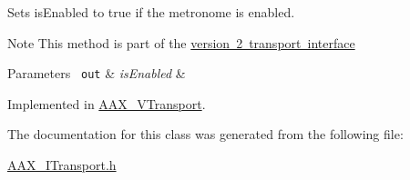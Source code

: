 Sets is\+Enabled to true if the metronome is enabled. 

\begin{DoxyNote}{Note}
This method is part of the \mbox{\hyperlink{a01761}{version 2 transport interface}}
\end{DoxyNote}

\begin{DoxyParams}[1]{Parameters}
\mbox{\texttt{ out}}  & {\em is\+Enabled} & \\
\hline
\end{DoxyParams}


Implemented in \mbox{\hyperlink{a01941_af5755db2dc7d6150dd4df19f536c4a40}{A\+A\+X\+\_\+\+V\+Transport}}.



The documentation for this class was generated from the following file\+:\begin{DoxyCompactItemize}
\item 
\mbox{\hyperlink{a00641}{A\+A\+X\+\_\+\+I\+Transport.\+h}}\end{DoxyCompactItemize}
